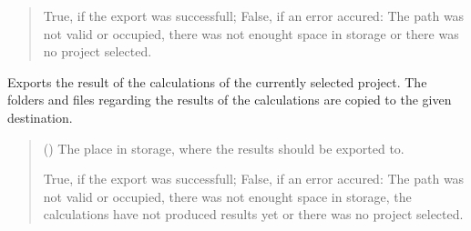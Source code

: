 \documentclass[letterpaper,10pt,english]{sphinxmanual}
\begin{document}
\begin{fulllineitems}
\begin{fulllineitems}
\begin{quote}
\begin{description}
\sphinxAtStartPar
True, if the export was successfull; False, if an error accured: The path was not valid or occupied, there was not enought space in storage or there was no project selected.

\sphinxAtStartPar
{}

\end{description}\end{quote}

\end{fulllineitems}


\begin{fulllineitems}
\label{\detokenize{apidoc/src.osm_configurator.control:src.osm_configurator.control.export_controller.ExportController.export_calculations}}
\pysigstartsignatures
{}
\pysigstopsignatures
\sphinxAtStartPar
Exports the result of the calculations of the currently selected project.
The folders and files regarding the results of the calculations are copied to the given destination.
\begin{quote}\begin{description}
\sphinxAtStartPar
{} () \textendash{} The place in storage, where the results should be exported to.

\sphinxAtStartPar
True, if the export was successfull; False, if an error accured: The path was not valid or occupied, there was not enought space in storage, the calculations have not produced results yet or there was no project selected.

\sphinxAtStartPar
{}

\end{description}\end{quote}

\end{fulllineitems}



\end{fulllineitems}
\end{document}
